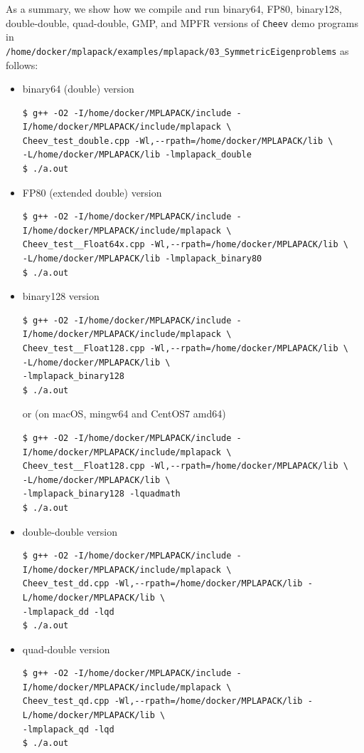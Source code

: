 \documentclass[12pt]{article}
\begin{document}
As a summary, we show how we compile and run binary64, FP80, binary128, double-double, quad-double, GMP, and MPFR versions of {\tt Cheev} demo programs in \\
{\tt /home/docker/mplapack/examples/mplapack/03\_SymmetricEigenproblems} as follows:
\begin{itemize}
    \item binary64 (double) version
\begin{verbatim}
$ g++ -O2 -I/home/docker/MPLAPACK/include -I/home/docker/MPLAPACK/include/mplapack \
Cheev_test_double.cpp -Wl,--rpath=/home/docker/MPLAPACK/lib \
-L/home/docker/MPLAPACK/lib -lmplapack_double
$ ./a.out
\end{verbatim}
\item FP80 (extended double) version
\begin{verbatim}
$ g++ -O2 -I/home/docker/MPLAPACK/include -I/home/docker/MPLAPACK/include/mplapack \
Cheev_test__Float64x.cpp -Wl,--rpath=/home/docker/MPLAPACK/lib \
-L/home/docker/MPLAPACK/lib -lmplapack_binary80
$ ./a.out
\end{verbatim}
\item binary128 version
\begin{verbatim}
$ g++ -O2 -I/home/docker/MPLAPACK/include -I/home/docker/MPLAPACK/include/mplapack \
Cheev_test__Float128.cpp -Wl,--rpath=/home/docker/MPLAPACK/lib \
-L/home/docker/MPLAPACK/lib \
-lmplapack_binary128
$ ./a.out
\end{verbatim}
or (on macOS, mingw64 and CentOS7 amd64)
\begin{verbatim}
$ g++ -O2 -I/home/docker/MPLAPACK/include -I/home/docker/MPLAPACK/include/mplapack \
Cheev_test__Float128.cpp -Wl,--rpath=/home/docker/MPLAPACK/lib \
-L/home/docker/MPLAPACK/lib \
-lmplapack_binary128 -lquadmath
$ ./a.out
\end{verbatim}
\item double-double version
\begin{verbatim}
$ g++ -O2 -I/home/docker/MPLAPACK/include -I/home/docker/MPLAPACK/include/mplapack \
Cheev_test_dd.cpp -Wl,--rpath=/home/docker/MPLAPACK/lib -L/home/docker/MPLAPACK/lib \
-lmplapack_dd -lqd
$ ./a.out
\end{verbatim}
\item quad-double version
\begin{verbatim}
$ g++ -O2 -I/home/docker/MPLAPACK/include -I/home/docker/MPLAPACK/include/mplapack \
Cheev_test_qd.cpp -Wl,--rpath=/home/docker/MPLAPACK/lib -L/home/docker/MPLAPACK/lib \
-lmplapack_qd -lqd
$ ./a.out
\end{verbatim}

\end{itemize}
\end{document}
